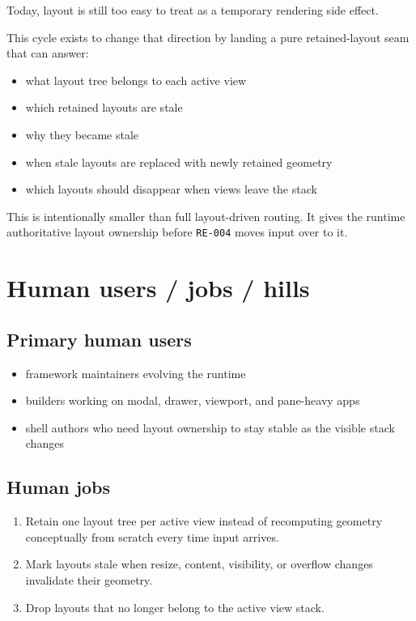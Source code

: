 Today, layout is still too easy to treat as a temporary rendering side effect.

This cycle exists to change that direction by landing a pure retained-layout seam that can answer:

\begin{itemize}
\tightlist
\item
  what layout tree belongs to each active view
\item
  which retained layouts are stale
\item
  why they became stale
\item
  when stale layouts are replaced with newly retained geometry
\item
  which layouts should disappear when views leave the stack
\end{itemize}

This is intentionally smaller than full layout-driven routing. It gives the runtime authoritative layout ownership before \texttt{R\allowbreak{}E\allowbreak{}-\allowbreak{}0\allowbreak{}0\allowbreak{}4} moves input over to it.

\section{Human users / jobs / hills}\label{record-151-human-users-jobs-hills}

\subsection{Primary human users}\label{record-151-primary-human-users}

\begin{itemize}
\tightlist
\item
  framework maintainers evolving the runtime
\item
  builders working on modal, drawer, viewport, and pane-heavy apps
\item
  shell authors who need layout ownership to stay stable as the visible stack changes
\end{itemize}

\subsection{Human jobs}\label{record-151-human-jobs}

\begin{enumerate}
\def\labelenumi{\arabic{enumi}.}
\tightlist
\item
  Retain one layout tree per active view instead of recomputing geometry conceptually from scratch every time input arrives.
\item
  Mark layouts stale when resize, content, visibility, or overflow changes invalidate their geometry.
\item
  Drop layouts that no longer belong to the active view stack.
\end{enumerate}

